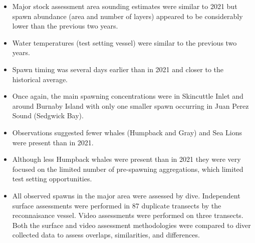 \begin{itemize}

\item Major stock assessment area sounding estimates
were similar to 2021 but spawn abundance (area and number of layers)
appeared to be considerably lower than the previous two years.

\item Water temperatures (test setting vessel) were similar to the previous two years.

\item Spawn timing was several days earlier than in 2021
and closer to the historical average.

\item Once again, the main spawning concentrations were in Skincuttle Inlet
and around Burnaby Island with only one smaller spawn
occurring in Juan Perez Sound (Sedgwick Bay).

\item Observations suggested fewer whales (Humpback and Gray)
and Sea Lions were present than in 2021.

\item Although less Humpback whales were present than in 2021
they were very focused on the limited number of pre-spawning aggregations,
which limited test setting opportunities.

\item All observed spawns in the major area were assessed by dive.
Independent surface assessments were performed in 87
duplicate transects by the reconnaisance vessel.
Video assessments were performed on three transects.
Both the surface and video assessment methodologies were compared
to diver collected data to assess overlaps, similarities, and differences.

\end{itemize}
